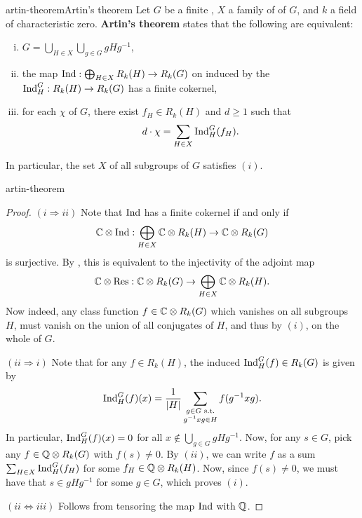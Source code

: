 \begin{topic}{artin-theorem}{Artin's theorem}
    Let $G$ be a finite , $X$ a family of  of $G$, and $k$ a field of characteristic zero. \textbf{Artin's theorem} states that the following are equivalent:
    \begin{enumerate}[(i)]
        \item $G = \bigcup_{H \in X} \bigcup_{g \in G} g H g^{-1}$,
        \item the map $\textup{Ind} : \bigoplus_{H \in X} R_k(H) \to R_k(G)$ on  induced by the  $\textup{Ind}_H^G : R_k(H) \to R_k(G)$ has a finite cokernel,
        \item for each  $\chi$ of $G$, there exist $f_H \in R_k(H)$ and $d \ge 1$ such that
        \[ d \cdot \chi = \sum_{H \in X} \textup{Ind}_H^G(f_H) . \]
    \end{enumerate}
    In particular, the set $X$ of all  subgroups of $G$ satisfies $(i)$.
\end{topic}

\begin{example}{artin-theorem}
    \begin{proof}
        $(i \Rightarrow ii)$ Note that $\textup{Ind}$ has a finite cokernel if and only if
        \[ \mathbb{C} \otimes \textup{Ind} : \bigoplus_{H \in X} \mathbb{C} \otimes R_k(H) \to \mathbb{C} \otimes R_k(G) \]
        is surjective. By , this is equivalent to the injectivity of the adjoint map
        \[ \mathbb{C} \otimes \textup{Res} : \mathbb{C} \otimes R_k(G) \to \bigoplus_{H \in X} \mathbb{C} \otimes R_k(H) . \]
        Now indeed, any class function $f \in \mathbb{C} \otimes R_k(G)$ which vanishes on all subgroups $H$, must vanish on the union of all conjugates of $H$, and thus by $(i)$, on the whole of $G$.
        
        $(ii \Rightarrow i)$ Note that for any $f \in R_k(H)$, the induced $\textup{Ind}_H^G(f) \in R_k(G)$ is given by
        \[ \textup{Ind}_H^G(f)(x) = \frac{1}{|H|} \sum_{\substack{g \in G \textup{ s.t.} \\ g^{-1} x g \in H }} f(g^{-1} x g) . \]
        In particular, $\textup{Ind}_H^G(f)(x) = 0$ for all $x \not\in \bigcup_{g \in G} g H g^{-1}$. Now, for any $s \in G$, pick any $f \in \mathbb{Q} \otimes R_k(G)$ with $f(s) \ne 0$. By $(ii)$, we can write $f$ as a sum $\sum_{H \in X} \textup{Ind}_H^G(f_H)$ for some $f_H \in \mathbb{Q} \otimes R_k(H)$. Now, since $f(s) \ne 0$, we must have that $s \in g H g^{-1}$ for some $g \in G$, which proves $(i)$.
        
        $(ii \Leftrightarrow iii)$ Follows from tensoring the map $\textup{Ind}$ with $\mathbb{Q}$.
    \end{proof}
\end{example}

